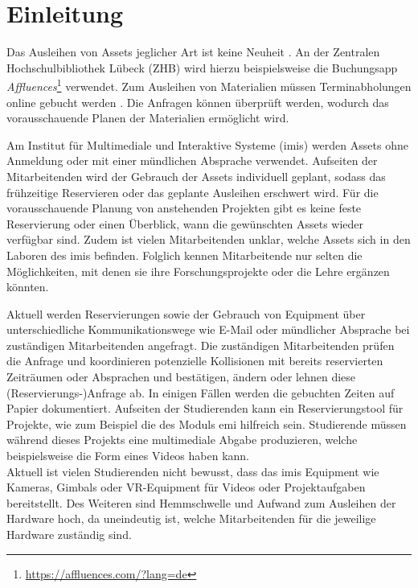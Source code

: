 
\chapter{Einleitung}
Das Ausleihen von Assets jeglicher Art ist keine Neuheit \cite{soderholm2018borrowing}. An der
Zentralen Hochschulbibliothek Lübeck (ZHB) wird hierzu beispielsweise die Buchungsapp
\textit{Affluences}\footnote{\url{https://affluences.com/?lang=de}} verwendet. Zum Ausleihen von
Materialien müssen Terminabholungen online gebucht werden \cite{zhb_offnung_nodate}. Die Anfragen
können überprüft werden, wodurch das vorausschauende Planen der Materialien ermöglicht wird. 

Am Institut für Multimediale und Interaktive Systeme (\ac{imis}) werden Assets ohne Anmeldung oder
mit einer mündlichen Absprache verwendet. Aufseiten der Mitarbeitenden wird der Gebrauch der Assets
individuell geplant, sodass das frühzeitige Reservieren oder das geplante Ausleihen erschwert wird.
Für die vorausschauende Planung von anstehenden Projekten gibt es keine feste Reservierung oder
einen Überblick, wann die gewünschten Assets wieder verfügbar sind. Zudem ist vielen Mitarbeitenden
unklar, welche Assets sich in den Laboren des \ac{imis} befinden. Folglich kennen Mitarbeitende nur
selten die Möglichkeiten, mit denen sie ihre Forschungsprojekte oder die Lehre ergänzen könnten.

Aktuell werden Reservierungen sowie der Gebrauch von Equipment über unterschiedliche
Kommunikationswege wie E-Mail oder mündlicher Absprache bei zuständigen Mitarbeitenden angefragt.
Die zuständigen Mitarbeitenden prüfen die Anfrage und koordinieren potenzielle Kollisionen mit
bereits reservierten Zeiträumen oder Absprachen und bestätigen, ändern oder lehnen diese
(Reservierungs-)Anfrage ab. In einigen Fällen werden die gebuchten Zeiten auf Papier dokumentiert.
Aufseiten der Studierenden kann ein Reservierungstool für Projekte, wie zum Beispiel die des Moduls
\ac{emi} hilfreich sein. Studierende müssen während dieses Projekts eine multimediale Abgabe
produzieren, welche beispielsweise die Form eines Videos haben kann.\\ Aktuell ist vielen
Studierenden nicht bewusst, dass das \ac{imis} Equipment wie Kameras, Gimbals oder VR-Equipment für
Videos oder Projektaufgaben bereitstellt. Des Weiteren sind Hemmschwelle und Aufwand zum Ausleihen
der Hardware hoch, da uneindeutig ist, welche Mitarbeitenden für die jeweilige Hardware zuständig
sind.

